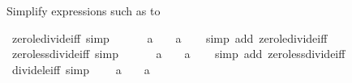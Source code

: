 \begin{isabellebody}
\begin{isamarkuptext}
Simplify expressions such as  to %
\end{isamarkuptext}\isamarkuptrue%
\isamarkupfalse%
\ zero{\isacharunderscore}{\kern0pt}le{\isacharunderscore}{\kern0pt}divide{\isacharunderscore}{\kern0pt}{}{\isacharunderscore}{\kern0pt}iff\ {\isacharbrackleft}{\kern0pt}simp{\isacharbrackright}{\kern0pt}{\isacharcolon}{\kern0pt}\isanewline
\ \ {\isachardoublequoteopen}{}\ {\isasymle}\ {}\ {\isacharslash}{\kern0pt}\ a\ {\isasymlongleftrightarrow}\ {}\ {\isasymle}\ a{\isachardoublequoteclose}\isanewline
%
\isadelimproof
\ \ %
\endisadelimproof
%
\isatagproof
{}\isamarkupfalse%
\ {\isacharparenleft}{\kern0pt}simp\ add{\isacharcolon}{\kern0pt}\ zero{\isacharunderscore}{\kern0pt}le{\isacharunderscore}{\kern0pt}divide{\isacharunderscore}{\kern0pt}iff{\isacharparenright}{\kern0pt}%
\endisatagproof
{\isafoldproof}%
%
\isadelimproof
\isanewline
%
\endisadelimproof
\isanewline
{}\isamarkupfalse%
\ zero{\isacharunderscore}{\kern0pt}less{\isacharunderscore}{\kern0pt}divide{\isacharunderscore}{\kern0pt}{}{\isacharunderscore}{\kern0pt}iff\ {\isacharbrackleft}{\kern0pt}simp{\isacharbrackright}{\kern0pt}{\isacharcolon}{\kern0pt}\isanewline
\ \ {\isachardoublequoteopen}{}\ {\isacharless}{\kern0pt}\ {}\ {\isacharslash}{\kern0pt}\ a\ {\isasymlongleftrightarrow}\ {}\ {\isacharless}{\kern0pt}\ a{\isachardoublequoteclose}\isanewline
%
\isadelimproof
\ \ %
\endisadelimproof
%
\isatagproof
{}\isamarkupfalse%
\ {\isacharparenleft}{\kern0pt}simp\ add{\isacharcolon}{\kern0pt}\ zero{\isacharunderscore}{\kern0pt}less{\isacharunderscore}{\kern0pt}divide{\isacharunderscore}{\kern0pt}iff{\isacharparenright}{\kern0pt}%
\endisatagproof
{\isafoldproof}%
%
\isadelimproof
\isanewline
%
\endisadelimproof
\isanewline
{}\isamarkupfalse%
\ divide{\isacharunderscore}{\kern0pt}le{\isacharunderscore}{\kern0pt}{}{\isacharunderscore}{\kern0pt}{}{\isacharunderscore}{\kern0pt}iff\ {\isacharbrackleft}{\kern0pt}simp{\isacharbrackright}{\kern0pt}{\isacharcolon}{\kern0pt}\isanewline
\ \ {\isachardoublequoteopen}{}\ {\isacharslash}{\kern0pt}\ a\ {\isasymle}\ {}\ {\isasymlongleftrightarrow}\ a\ {\isasymle}\ {}{\isachardoublequoteclose}\isanewline
%
\isadelimproof
\ \ %
\endisadelimproof
%
\isatagproof
{}\isamarkupfalse%

\end{isabellebody}
